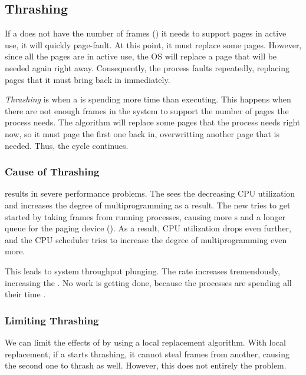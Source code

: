 \subsection{Thrashing}\label{subsec:Thrashing}
If a  does not have the number of frames () it needs to support pages in active use, it will quickly page-fault.
At this point, it must replace some pages.
However, since all the pages are in active use, the OS will replace a page that will be needed again right away.
Consequently, the process faults repeatedly, replacing pages that it must bring back in immediately.

\begin{definition}[Thrashing]\label{def:Thrashing}
  \emph{Thrashing} is when a  is spending more time  than executing.
  This happens when there are not enough frames in the system to support the number of pages the process needs.
  The  algorithm will replace some pages that the process needs right now, so it must page the first one back in, overwritting another page that is needed.
  Thus, the cycle continues.
\end{definition}

\subsubsection{Cause of Thrashing}\label{subsubsec:Thrashing_Cause}
 results in severe performance problems.
The  sees the decreasing CPU utilization and increases the degree of multiprogramming as a result.
The new  tries to get started by taking frames from running processes, causing more s and a longer queue for the paging device ().
As a result, CPU utilization drops even further, and the CPU scheduler tries to increase the degree of multiprogramming even more.

This leads to system throughput plunging.
The  rate increases tremendously, increasing the .
No work is getting done, because the processes are spending all their time .

\subsubsection{Limiting Thrashing}\label{subsubsec:Limiting_Thrashing}
We can limit the effects of  by using a local replacement algorithm.
With local replacement, if a  starts thrashing, it cannot steal frames from another, causing the second one to thrash as well.
However, this does not entirely the problem.

